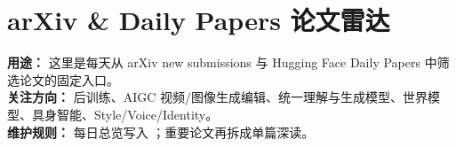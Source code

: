 
\part*{arXiv \& Daily Papers 论文雷达}

\begin{conceptbox}
\textbf{用途：} 这里是每天从 arXiv new submissions 与 Hugging Face Daily Papers 中筛选论文的固定入口。\\
\textbf{关注方向：} 后训练、AIGC 视频/图像生成编辑、统一理解与生成模型、世界模型、具身智能、Style/Voice/Identity。\\
\textbf{维护规则：} 每日总览写入 ；重要论文再拆成单篇深读。
\end{conceptbox}





